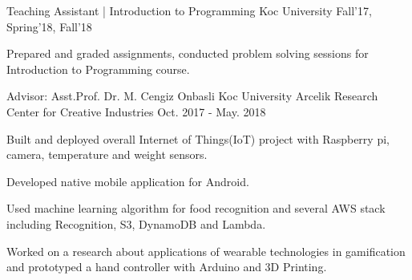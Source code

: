 \begin{cventries}
  \cvopenentry
    {Teaching Assistant | Introduction to Programming } %
    {Koc University} %
    {}
    {Fall'17, Spring'18, Fall'18} %
    {
      \begin{cvitems} %
        \item {Prepared and graded assignments, conducted problem solving sessions for Introduction to Programming course.}
      \end{cvitems}
    }

  \cvopenentry
    {Advisor: Asst.Prof. Dr. M. Cengiz Onbasli} %
    {Koc University Arcelik Research Center for Creative Industries} %
    {}
    {Oct. 2017 - May. 2018} %
    {
      \begin{cvitems} %
        \item {Built and deployed overall Internet of Things(IoT) project with Raspberry pi, camera, temperature and weight sensors.  }
        \item {Developed native mobile application for Android. }
       	\item {Used machine learning algorithm for food recognition and several AWS stack including Recognition, S3, DynamoDB and Lambda.} 
         \item {Worked on a research about applications  of wearable technologies in gamification and prototyped a hand controller with Arduino and 3D Printing.}
      \end{cvitems}
    }


\end{cventries}
